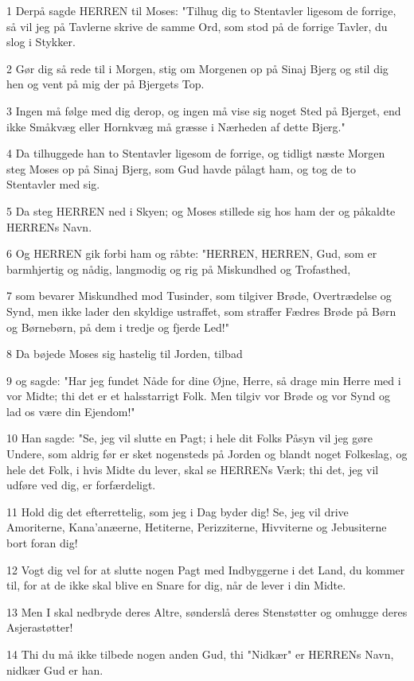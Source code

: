 \par 1 Derpå sagde HERREN til Moses: "Tilhug dig to Stentavler ligesom de forrige, så vil jeg på Tavlerne skrive de samme Ord, som stod på de forrige Tavler, du slog i Stykker.
\par 2 Gør dig så rede til i Morgen, stig om Morgenen op på Sinaj Bjerg og stil dig hen og vent på mig der på Bjergets Top.
\par 3 Ingen må følge med dig derop, og ingen må vise sig noget Sted på Bjerget, end ikke Småkvæg eller Hornkvæg må græsse i Nærheden af dette Bjerg."
\par 4 Da tilhuggede han to Stentavler ligesom de forrige, og tidligt næste Morgen steg Moses op på Sinaj Bjerg, som Gud havde pålagt ham, og tog de to Stentavler med sig.
\par 5 Da steg HERREN ned i Skyen; og Moses stillede sig hos ham der og påkaldte HERRENs Navn.
\par 6 Og HERREN gik forbi ham og råbte: "HERREN, HERREN, Gud, som er barmhjertig og nådig, langmodig og rig på Miskundhed og Trofasthed,
\par 7 som bevarer Miskundhed mod Tusinder, som tilgiver Brøde, Overtrædelse og Synd, men ikke lader den skyldige ustraffet, som straffer Fædres Brøde på Børn og Børnebørn, på dem i tredje og fjerde Led!"
\par 8 Da bøjede Moses sig hastelig til Jorden, tilbad
\par 9 og sagde: "Har jeg fundet Nåde for dine Øjne, Herre, så drage min Herre med i vor Midte; thi det er et halsstarrigt Folk. Men tilgiv vor Brøde og vor Synd og lad os være din Ejendom!"
\par 10 Han sagde: "Se, jeg vil slutte en Pagt; i hele dit Folks Påsyn vil jeg gøre Undere, som aldrig før er sket nogensteds på Jorden og blandt noget Folkeslag, og hele det Folk, i hvis Midte du lever, skal se HERRENs Værk; thi det, jeg vil udføre ved dig, er forfærdeligt.
\par 11 Hold dig det efterrettelig, som jeg i Dag byder dig! Se, jeg vil drive Amoriterne, Kana'anæerne, Hetiterne, Perizziterne, Hivviterne og Jebusiterne bort foran dig!
\par 12 Vogt dig vel for at slutte nogen Pagt med Indbyggerne i det Land, du kommer til, for at de ikke skal blive en Snare for dig, når de lever i din Midte.
\par 13 Men I skal nedbryde deres Altre, sønderslå deres Stenstøtter og omhugge deres Asjerastøtter!
\par 14 Thi du må ikke tilbede nogen anden Gud, thi "Nidkær" er HERRENs Navn, nidkær Gud er han.

